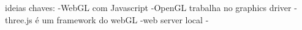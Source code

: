 ideias chaves:
-WebGL com Javascript
-OpenGL trabalha no graphics driver
-three.js é um framework do webGL
-web server local
-
